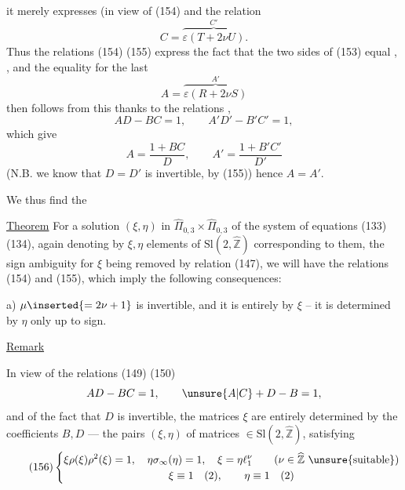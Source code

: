 
it merely expresses (in view of (154) and  the relation
\[
C=\overbrace{\varepsilon(T+2\nu U)}^{C'}.
\]
Thus the relations (154) (155) express the fact that the two sides of (153)   equal  , , and the equality for the last
\[
A=\overbrace{\varepsilon(R+2\nu S)}^{A'}
\]
then follows from this thanks to the relations , 
\[
AD-BC=1,\qquad A'D'-B'C'=1,
\]
which give
\[
A=\frac{1+BC}{D},\qquad A'=\frac{1+B'C'}{D'}
\]
(N.B. we know that $D=D'$ is invertible, by (155)) hence $A=A'$.

We thus find the

\uline{Theorem} For a solution $(\xi,\eta)$ in $\widehat{\Pi}_{0,3}\times\widehat{\Pi}_{0,3}$ of the system of equations (133) (134), again denoting by $\xi,\eta$ elements of $\mathrm{Sl}(2,\widehat{\mathbb Z})$ corresponding to them, the sign ambiguity for $\xi$ being removed by relation (147), we will have the relations (154) and (155), which imply the following consequences:

a) $\mu\inserted{=2\nu+1}$ is invertible, and it is entirely  by $\xi$ -- it is determined by $\eta$ only up to sign.


\uline{Remark}

In view of the relations (149) (150)
\[
AD-BC=1,\qquad \unsure{A|C}+D-B=1,
\]
and of the fact that $D$ is invertible, the matrices $\xi$ are entirely determined by the coefficients $B,D$ --- the pairs $(\xi,\eta)$ of matrices $\in\mathrm{Sl}(2,\widehat{\mathbb Z})$, satisfying
\[
\tag{156}
\left\{\begin{gathered}
\xi\rho(\xi)\rho^2(\xi)=1,\quad
\eta\sigma_\infty(\eta)=1,\quad
\xi=\eta\ell_1^\nu
\qquad(\nu\in\widehat{\mathbb Z}\ \text{\unsure{suitable}})\\
\xi\equiv1\quad(2),\qquad\eta\equiv1\quad(2)
\end{gathered}\right.
\]


